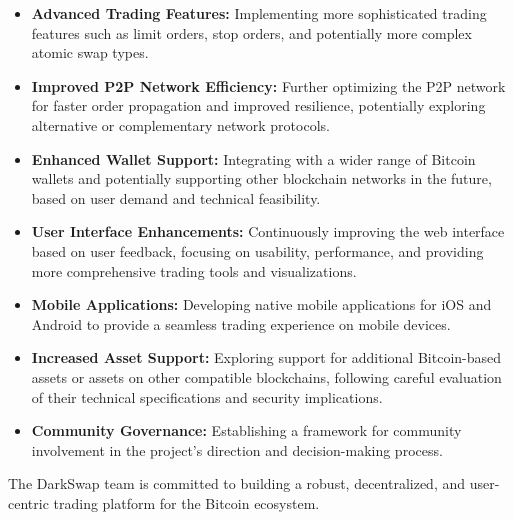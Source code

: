 \documentclass{article}
\begin{document}
\begin{itemize}
    \item \textbf{Advanced Trading Features:} Implementing more sophisticated trading features such as limit orders, stop orders, and potentially more complex atomic swap types.
    \item \textbf{Improved P2P Network Efficiency:} Further optimizing the P2P network for faster order propagation and improved resilience, potentially exploring alternative or complementary network protocols.
    \item \textbf{Enhanced Wallet Support:} Integrating with a wider range of Bitcoin wallets and potentially supporting other blockchain networks in the future, based on user demand and technical feasibility.
    \item \textbf{User Interface Enhancements:} Continuously improving the web interface based on user feedback, focusing on usability, performance, and providing more comprehensive trading tools and visualizations.
    \item \textbf{Mobile Applications:} Developing native mobile applications for iOS and Android to provide a seamless trading experience on mobile devices.
    \item \textbf{Increased Asset Support:} Exploring support for additional Bitcoin-based assets or assets on other compatible blockchains, following careful evaluation of their technical specifications and security implications.
    \item \textbf{Community Governance:} Establishing a framework for community involvement in the project's direction and decision-making process.
\end{itemize}

The DarkSwap team is committed to building a robust, decentralized, and user-centric trading platform for the Bitcoin ecosystem.
\end{document}
